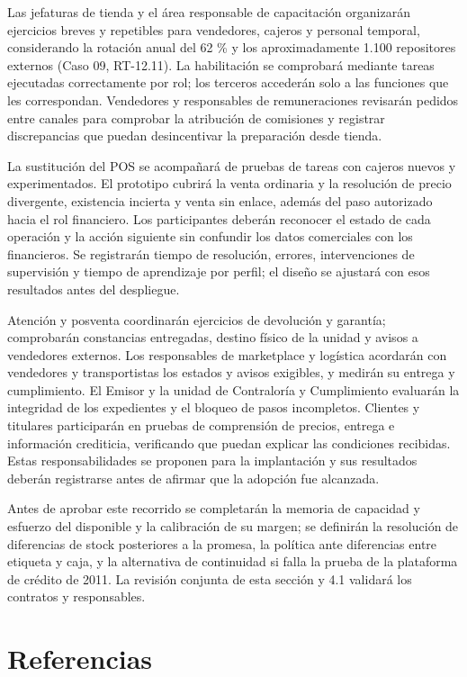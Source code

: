 \documentclass[11pt]{article}
\begin{document}
{Las jefaturas de tienda y el área responsable de capacitación organizarán ejercicios breves y repetibles para vendedores, cajeros y personal temporal, considerando la rotación anual del 62 \% y los aproximadamente 1.100 repositores externos (Caso 09, RT-12.11). La habilitación se comprobará mediante tareas ejecutadas correctamente por rol; los terceros accederán solo a las funciones que les correspondan. Vendedores y responsables de remuneraciones revisarán pedidos entre canales para comprobar la atribución de comisiones y registrar discrepancias que puedan desincentivar la preparación desde tienda.}

{La sustitución del POS se acompañará de pruebas de tareas con cajeros nuevos y experimentados. El prototipo cubrirá la venta ordinaria y la resolución de precio divergente, existencia incierta y venta sin enlace, además del paso autorizado hacia el rol financiero. Los participantes deberán reconocer el estado de cada operación y la acción siguiente sin confundir los datos comerciales con los financieros. Se registrarán tiempo de resolución, errores, intervenciones de supervisión y tiempo de aprendizaje por perfil; el diseño se ajustará con esos resultados antes del despliegue.}

{Atención y posventa coordinarán ejercicios de devolución y garantía; comprobarán constancias entregadas, destino físico de la unidad y avisos a vendedores externos. Los responsables de marketplace y logística acordarán con vendedores y transportistas los estados y avisos exigibles, y medirán su entrega y cumplimiento. El Emisor y la unidad de Contraloría y Cumplimiento evaluarán la integridad de los expedientes y el bloqueo de pasos incompletos. Clientes y titulares participarán en pruebas de comprensión de precios, entrega e información crediticia, verificando que puedan explicar las condiciones recibidas. Estas responsabilidades se proponen para la implantación y sus resultados deberán registrarse antes de afirmar que la adopción fue alcanzada.}

{Antes de aprobar este recorrido se completarán la memoria de capacidad y esfuerzo del disponible y la calibración de su margen; se definirán la resolución de diferencias de stock posteriores a la promesa, la política ante diferencias entre etiqueta y caja, y la alternativa de continuidad si falla la prueba de la plataforma de crédito de 2011. La revisión conjunta de esta sección y 4.1 validará los contratos y responsables.}


\section*{Referencias}
\end{document}

